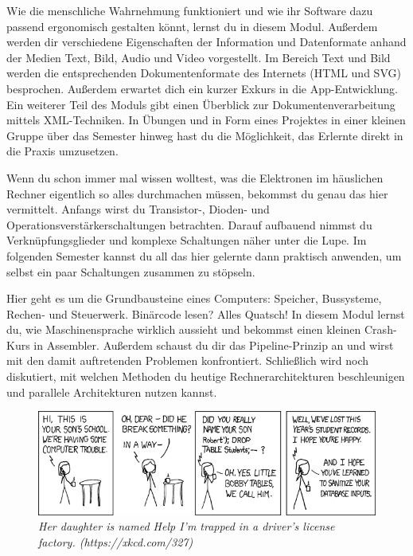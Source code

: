 \newpage

Wie die menschliche Wahrnehmung funktioniert und wie ihr Software dazu passend ergonomisch gestalten könnt, lernst du in diesem Modul.
Außerdem werden dir verschiedene Eigenschaften der Information und Datenformate anhand der Medien Text, Bild, Audio und Video vorgestellt.
Im Bereich Text und Bild werden die entsprechenden Dokumentenformate des Internets (HTML und SVG) besprochen.
Außerdem erwartet dich ein kurzer Exkurs in die App-Entwicklung.
Ein weiterer Teil des Moduls gibt einen Überblick zur Dokumentenverarbeitung mittels XML-Techniken.
In Übungen und in Form eines Projektes in einer kleinen Gruppe über das Semester hinweg hast du die Möglichkeit, das Erlernte direkt in die Praxis umzusetzen.

Wenn du schon immer mal wissen wolltest, was die Elektronen im häuslichen Rechner eigentlich so alles durchmachen müssen, bekommst du genau das hier vermittelt.
Anfangs wirst du Transistor-, Dioden- und Operationsverstärkerschaltungen betrachten.
Darauf aufbauend nimmst du Verknüpfungsglieder und komplexe Schaltungen näher unter die Lupe.
Im folgenden Semester kannst du all das hier gelernte dann praktisch anwenden, um selbst ein paar Schaltungen zusammen zu stöpseln.

Hier geht es um die Grundbausteine eines Computers:
Speicher, Bussysteme, Rechen- und Steuerwerk.
Binärcode lesen? Alles Quatsch! In diesem Modul lernst du, wie Maschinensprache wirklich aussieht und bekommst einen kleinen Crash-Kurs in Assembler.
Außerdem schaust du dir das Pipeline-Prinzip an und wirst mit den damit auftretenden Problemen konfrontiert.
Schließlich wird noch diskutiert, mit welchen Methoden du heutige Rechnerarchitekturen beschleunigen und parallele Architekturen nutzen kannst.

\vfill

\begin{figure}[h!]
\centering
\includegraphics[scale=.5]{img/xkcd/exploits_of_a_mom.png}
\caption*{{\small \textit{Her daughter is named Help I'm trapped in a driver's license factory. (https://xkcd.com/327)}}}
\end{figure}

